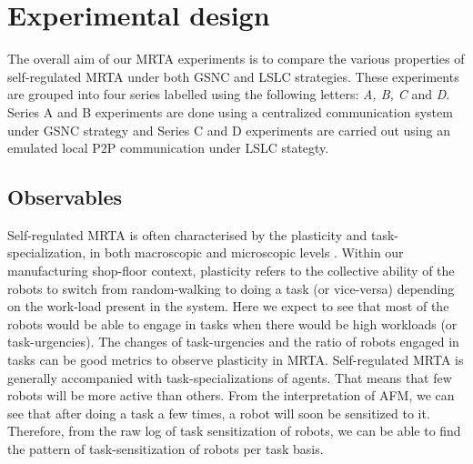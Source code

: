 \documentclass[journal]{IEEEtran}
\begin{document}
\section{Experimental design}
\label{sec:expt-design}
The overall aim of our MRTA experiments is to compare the various properties of self-regulated MRTA under both GSNC and LSLC strategies. These experiments are grouped into four series labelled using the following letters: \textit{A, B, C} and \textit{D}. Series A and B experiments are done using a centralized communication system under GSNC strategy and Series C and D experiments are carried out using an emulated local P2P communication under LSLC stategty. %
\vspace*{-0.3cm}
\subsection{Observables}
%
Self-regulated MRTA is often characterised by the plasticity and task-specialization, in both macroscopic and microscopic levels \cite{Garnier+2007}. Within our manufacturing shop-floor context, plasticity refers to the collective ability of the robots to switch from  random-walking to doing a task (or vice-versa) depending on the work-load present in the system. Here we expect to see that most of the robots would be able to engage in tasks when there would be high workloads (or task-urgencies). The changes of task-urgencies and the ratio of robots engaged in tasks can be good metrics to observe plasticity in MRTA.
%
Self-regulated MRTA is generally accompanied with task-specializations of agents. That means that few robots will be more active than others. From the interpretation of AFM, we can see that after doing a task a few times, a robot will soon be sensitized to it. Therefore, from the raw log of task sensitization of robots, we can be able to find the pattern of task-sensitization of robots per task basis.
%
\end{document}
